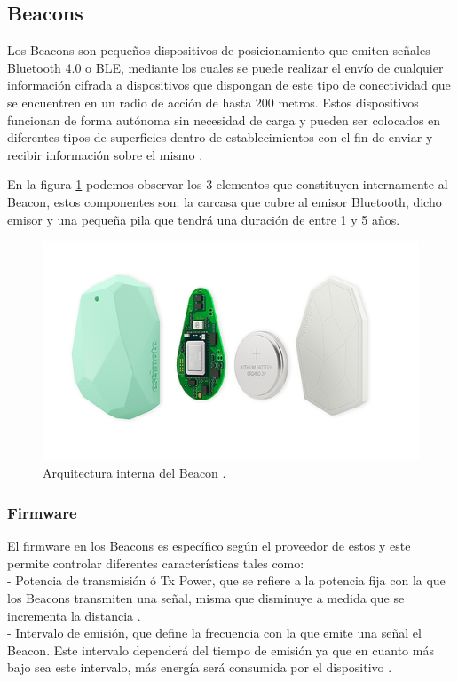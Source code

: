 \subsection{Beacons}
Los Beacons son pequeños dispositivos de posicionamiento que emiten señales Bluetooth 4.0 o BLE, mediante los cuales se puede realizar el envío de cualquier información cifrada a dispositivos que dispongan de este tipo de conectividad que se encuentren en un radio de acción de hasta 200 metros. Estos dispositivos funcionan de forma autónoma sin necesidad de carga y  pueden ser colocados en diferentes tipos de superficies dentro de establecimientos con el fin de enviar y recibir información sobre el mismo \cite{Beacon1}. 
\\ \par
En la figura \ref{imagen:arquitecturaBeaon} podemos observar los 3 elementos que constituyen internamente al Beacon, estos componentes son: la carcasa que cubre al emisor Bluetooth, dicho emisor y una pequeña pila que tendrá una duración de entre 1 y 5 años. 
\FloatBarrier
\begin{figure}[htbp!]
		\centering
			\includegraphics[width=.5 \textwidth]{imagenes/beacon_archi}
		\caption{Arquitectura interna del Beacon \cite{Beacon2}.}
		\label{imagen:arquitecturaBeaon}
\end{figure}
\FloatBarrier
\subsubsection{Firmware}
El firmware en los Beacons es específico según el proveedor de estos y este permite controlar diferentes características tales como:
\\
- Potencia de transmisión ó Tx Power, que se refiere a la potencia fija con la que los Beacons transmiten una señal, misma que disminuye a medida que se incrementa la distancia \cite{Beacon3}.\\
- Intervalo de emisión, que define la frecuencia con la que emite una señal el Beacon. Este intervalo  dependerá del tiempo de emisión ya que en cuanto más bajo sea este intervalo, más energía será consumida por el dispositivo \cite{Beacon3}. 
\\ \par
